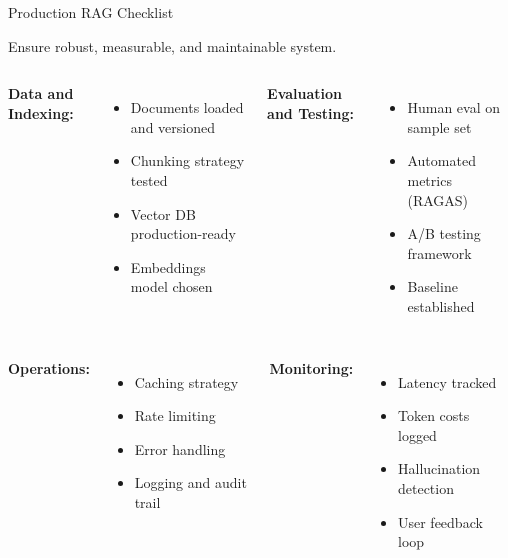 \documentclass[aspectratio=169,11pt]{beamer}
\begin{document}
\begin{frame}{Production RAG Checklist}
  \begin{conceptbox}
    Ensure robust, measurable, and maintainable system.
  \end{conceptbox}

  \begin{columns}[T]
    \textbf{Data and Indexing:}
    \begin{itemize}
    \setlength{\itemsep}{1pt}
      \item Documents loaded and versioned
      \item Chunking strategy tested
      \item Vector DB production-ready
      \item Embeddings model chosen
    \end{itemize}

    \textbf{Evaluation and Testing:}
    \begin{itemize}
    \setlength{\itemsep}{1pt}
      \item Human eval on sample set
      \item Automated metrics (RAGAS)
      \item A/B testing framework
      \item Baseline established
    \end{itemize}
  \end{columns}

  \begin{columns}[T]
    \textbf{Operations:}
    \begin{itemize}
    \setlength{\itemsep}{1pt}
      \item Caching strategy
      \item Rate limiting
      \item Error handling
      \item Logging and audit trail
    \end{itemize}

    \textbf{Monitoring:}
    \begin{itemize}
    \setlength{\itemsep}{1pt}
      \item Latency tracked
      \item Token costs logged
      \item Hallucination detection
      \item User feedback loop
    \end{itemize}
  \end{columns}
\end{frame}
\end{document}
